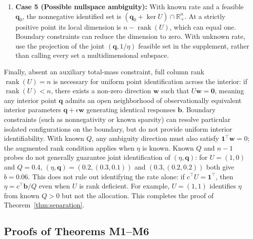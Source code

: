 \documentclass[10pt,twocolumn,letterpaper]{article}
\theoremstyle{definition}
\theoremstyle{remark}
\begin{document}
\begin{enumerate}
    \item \textbf{Case 5 (Possible nullspace ambiguity):} With known rate and a feasible $\mathbf q_0$, the nonnegative identified set is $(\mathbf q_0+\ker U)\cap\mathbb R_+^n$. At a strictly positive point its local dimension is $n-\operatorname{rank}(U)$, which can equal one. Boundary constraints can reduce the dimension to zero. With unknown rate, use the projection of the joint $(\mathbf q,1/\eta)$ feasible set in the supplement, rather than calling every set a multidimensional subspace.
\end{enumerate}
Finally, absent an auxiliary total-mass constraint, full column rank $\operatorname{rank}(U) = n$ is necessary for uniform point identification across the interior: if $\operatorname{rank}(U) < n$, there exists a non-zero direction $\mathbf{w}$ such that $U\mathbf{w}=\mathbf{0}$, meaning any interior point $\mathbf{q}$ admits an open neighborhood of observationally equivalent interior parameters $\mathbf{q} + \epsilon \mathbf{w}$ generating identical responses $\mathbf{b}$. Boundary constraints (such as nonnegativity or known sparsity) can resolve particular isolated configurations on the boundary, but do not provide uniform interior identifiability. With known $Q$, any ambiguity direction must also satisfy $\mathbf{1}^\top\mathbf{w}=0$; the augmented rank condition applies when $\eta$ is known. Known $Q$ and $n-1$ probes do not generally guarantee joint identification of $(\eta,\mathbf q)$: for $U=(1,0)$ and $Q=0.4$, $(\eta,\mathbf q)=(0.2,(0.3,0.1))$ and $(0.3,(0.2,0.2))$ both give $b=0.06$. This does not rule out identifying the rate alone: if $c^\top U=\mathbf1^\top$, then $\eta=c^\top\mathbf b/Q$ even when $U$ is rank deficient. For example, $U=(1,1)$ identifies $\eta$ from known $Q>0$ but not the allocation. This completes the proof of Theorem~\ref{thm:separation}.

\subsection{Proofs of Theorems M1--M6}
\label{app:m_proofs}
\end{document}
